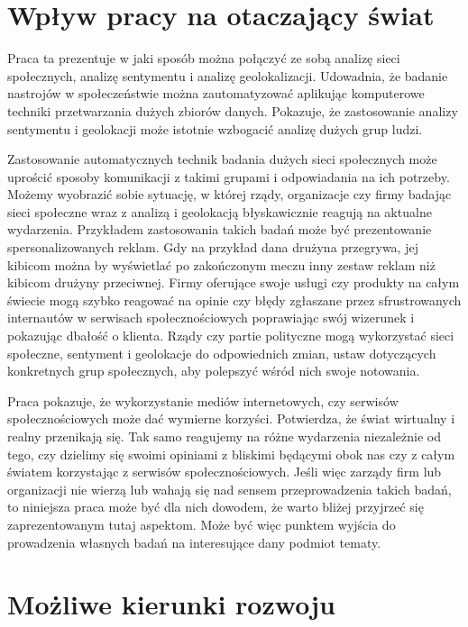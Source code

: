 \section{Wpływ pracy na otaczający świat}
Praca ta prezentuje w jaki sposób można połączyć ze sobą analizę sieci społecznych,
analizę sentymentu i analizę geolokalizacji. Udowadnia, że badanie nastrojów
w społeczeństwie można zautomatyzować aplikując komputerowe techniki przetwarzania
dużych zbiorów danych. Pokazuje, że zastosowanie analizy sentymentu i geolokacji
może istotnie wzbogacić analizę dużych grup ludzi.

Zastosowanie automatycznych technik badania dużych sieci społecznych
może uprościć sposoby komunikacji z takimi grupami i odpowiadania na ich potrzeby.
Możemy wyobrazić sobie sytuację, w której rządy, organizacje czy firmy badając
sieci społeczne wraz z analizą i geolokacją błyskawicznie reagują na aktualne
wydarzenia. Przykładem zastosowania takich badań może być prezentowanie
spersonalizowanych reklam. Gdy na przykład dana drużyna przegrywa, jej kibicom
można by wyświetlać po zakończonym meczu inny zestaw reklam niż kibicom drużyny 
przeciwnej. Firmy oferujące swoje usługi czy produkty na całym świecie
mogą szybko reagować na opinie czy błędy zgłaszane przez sfrustrowanych internautów
w serwisach społecznościowych poprawiając swój wizerunek i pokazując dbałość
o klienta. Rządy czy partie polityczne mogą wykorzystać sieci społeczne,
sentyment i geolokacje do odpowiednich zmian, ustaw dotyczących konkretnych grup
społecznych, aby polepszyć wśród nich swoje notowania.

Praca pokazuje, że wykorzystanie mediów internetowych, czy
serwisów społecznościowych może dać wymierne korzyści. Potwierdza, że
świat wirtualny i realny przenikają się. Tak samo reagujemy na różne
wydarzenia niezależnie od tego, czy dzielimy się swoimi opiniami z bliskimi będącymi obok
nas czy z całym światem korzystając z serwisów społecznościowych. Jeśli więc
zarządy firm lub organizacji nie wierzą lub wahają się nad sensem przeprowadzenia
takich badań, to niniejsza praca może być dla nich dowodem, że warto bliżej
przyjrzeć się zaprezentowanym tutaj aspektom. Może być więc punktem wyjścia
do prowadzenia własnych badań na interesujące dany podmiot tematy.



\section{Możliwe kierunki rozwoju}

